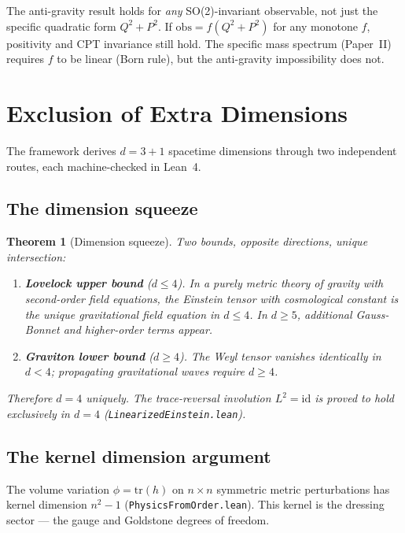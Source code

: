 \documentclass[11pt,letterpaper]{article}
\newtheorem{theorem}{Theorem}
\begin{document}
The anti-gravity result holds for \emph{any} SO(2)-invariant observable,
not just the specific quadratic form $Q^2 + P^2$. If $\mathrm{obs} =
f(Q^2 + P^2)$ for any monotone $f$, positivity and CPT invariance
still hold. The specific mass spectrum (Paper~II) requires $f$ to be
linear (Born rule), but the anti-gravity impossibility does not.

\section{Exclusion of Extra Dimensions}

The framework derives $d = 3{+}1$ spacetime dimensions through two
independent routes, each machine-checked in Lean~4.

\subsection{The dimension squeeze}

\begin{theorem}[Dimension squeeze]
\label{thm:extradim}
Two bounds, opposite directions, unique intersection:
\begin{enumerate}[nosep]
  \item \textbf{Lovelock upper bound} ($d \leq 4$).  In a purely
    metric theory of gravity with second-order field equations, the
    Einstein tensor with cosmological constant is the unique
    gravitational field equation in $d \leq 4$.  In $d \geq 5$,
    additional Gauss-Bonnet and higher-order terms appear.
  \item \textbf{Graviton lower bound} ($d \geq 4$).  The Weyl
    tensor vanishes identically in $d < 4$; propagating
    gravitational waves require $d \geq 4$.
\end{enumerate}
Therefore $d = 4$ uniquely.  The trace-reversal involution
$L^2 = \mathrm{id}$ is proved to hold exclusively in $d = 4$
(\texttt{LinearizedEinstein.lean}).
\end{theorem}

\subsection{The kernel dimension argument}

The volume variation $\phi = \mathrm{tr}(h)$ on $n \times n$
symmetric metric perturbations has kernel dimension $n^2 - 1$
(\texttt{PhysicsFromOrder.lean}).  This kernel is the dressing
sector --- the gauge and Goldstone degrees of freedom.
\end{document}
